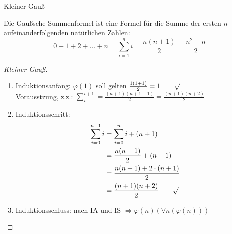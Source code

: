 \documentclass[12pt%
,aspectratio=169%
]{beamer}
\begin{document}
\begin{frame}{Kleiner Gauß}
\begin{theorem}
Die Gaußsche Summenformel ist eine Formel für die Summe der ersten $n$ aufeinanderfolgenden natürlichen Zahlen: 
$$
	0 + 1 + 2 + \ldots + n = \sum_{i=1}^{n} i = \frac{n(n + 1)}{2} = \frac{n^2 + n }{2}
$$
\end{theorem}
\end{frame}

\begin{frame}
\vspace*{-1cm}
\begin{proof}[Kleiner Gauß]
\begin{enumerate}
	\item Induktionsanfang: $\varphi(1)$ soll gelten $\frac{1(1 + 1)}{2} =  1  \qquad \surd$\\
	Vorausstzung, z.z.: $\sum_i^{i+1} = \frac{(n + 1)(n + 1 + 1)}{2} = \frac{(n + 1)(n + 2)}{2}$
	\item Induktionsschritt:
\begin{align*}
\sum_{i=0}^{n+1} i &= \sum_{i=0}^{n} i + (n+1) \\
&= \frac{n(n + 1)}{2} + (n + 1) \\
&= \frac{n(n + 1) + 2 \cdot (n + 1)}{2} \\
&= \frac{(n + 1)(n + 2)}{2} \qquad \surd
\end{align*}
	\item Induktionsschluss: $\text{nach IA und IS } \Rightarrow \varphi(n) (\forall n(\varphi(n)))$
\end{enumerate}
\end{proof}
\end{frame}
\end{document}
